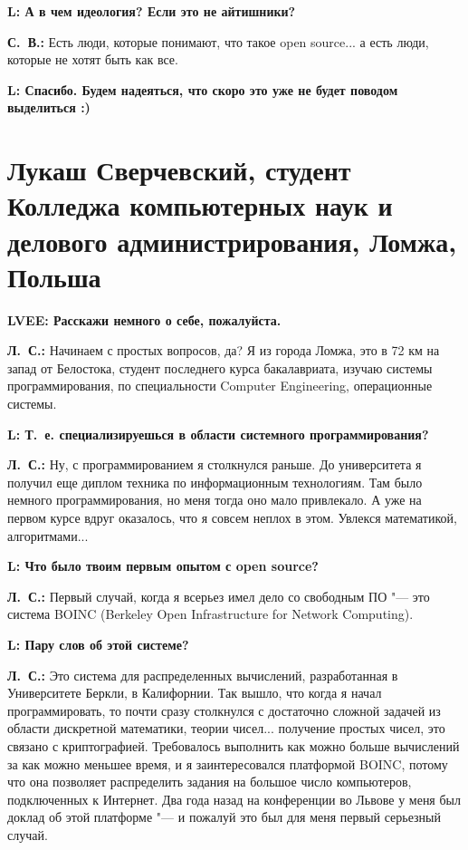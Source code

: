 \documentclass[10pt, a5paper]{article}
\begin{document}
{\noindent \bf L: А в чем идеология? Если это не айтишники?}

{\noindent \bf С.~В.:} Есть люди, которые понимают, что такое open source... а есть люди, которые не хотят быть как все. 

{\noindent \bf L: Спасибо. Будем надеяться, что скоро это уже не будет поводом выделиться :)}

\section[Лукаш Сверчевский, Ломжа, Польша]{Лукаш Сверчевский, студент Колледжа компьютерных наук и делового администрирования, Ломжа, Польша}

{\noindent \bf LVEE: Расскажи немного о себе, пожалуйста.}

{\noindent \bf Л.~С.:} Начинаем с простых вопросов, да? Я из города Ломжа, это в 72 км на запад от Белостока, студент последнего курса бакалавриата, изучаю системы программирования,  по специальности Computer Engineering, операционные системы. 

{\noindent \bf L: Т.~е. специализируешься в области системного программирования?}

{\noindent \bf Л.~С.:} Ну, с программированием я столкнулся раньше. До университета я получил еще диплом техника по информационным технологиям. Там было немного программирования, но меня тогда оно мало привлекало. А уже на первом курсе вдруг оказалось, что я совсем неплох в этом. Увлекся математикой, алгоритмами... 

{\noindent \bf L: Что было твоим первым опытом с open source?}

{\noindent \bf Л.~С.:} Первый случай, когда я всерьез имел дело со свободным ПО "--- это система BOINC (Berkeley Open Infrastructure for Network Computing). 

{\noindent \bf L: Пару слов об этой системе?}

{\noindent \bf Л.~С.:} Это система для распределенных вычислений, разработанная в Университете Беркли, в Калифорнии. Так вышло, что когда я начал программировать, то почти сразу столкнулся с достаточно сложной задачей из области дискретной математики, теории чисел... получение простых чисел, это связано с криптографией. Требовалось выполнить как можно больше вычислений за как можно меньшее время, и я заинтересовался платформой BOINC, потому что она позволяет распределить задания на большое число компьютеров, подключенных к Интернет. Два года назад на конференции во Львове у меня был доклад об этой платформе "--- и пожалуй это был для меня первый серьезный случай.
\end{document}

